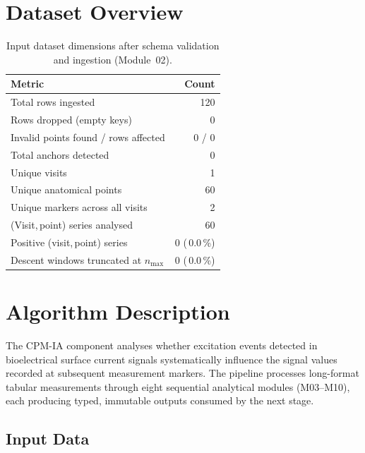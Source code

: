 \documentclass[a4paper,11pt]{article}
\begin{document}
\section{Dataset Overview}

\begin{table}[h!]
\centering
\small
\caption{Input dataset dimensions after schema validation and ingestion (Module~02).}
\begin{tabular}{lr}
\toprule
\textbf{Metric} & \textbf{Count} \\
\midrule
Total rows ingested                        & 120 \\
Rows dropped (empty keys)                  & 0 \\
Invalid points found / rows affected       & 0 / 0 \\
Total anchors detected                     & 0 \\
Unique visits                          & 1 \\
Unique anatomical points               & 60 \\
Unique markers across all visits       & 2 \\
(Visit,\,point) series analysed        & 60 \\
Positive (visit,\,point) series        & 0 (\,0.0\,\%) \\
Descent windows truncated at $n_{\max}$ & 0 (\,0.0\,\%) \\
\bottomrule
\end{tabular}
\end{table}

\section{Algorithm Description}

The CPM-IA component analyses whether excitation events detected in bioelectrical surface
current signals systematically influence the signal values recorded at subsequent measurement
markers. The pipeline processes long-format tabular measurements through eight sequential
analytical modules (M03--M10), each producing typed, immutable outputs consumed by the next
stage.

\subsection{Input Data}
\end{document}
